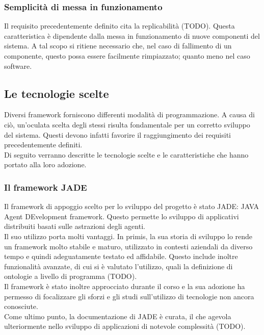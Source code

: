 \subsubsection{Semplicità di messa in funzionamento}
Il requisito precedentemente definito cita la replicabilità (TODO). Questa caratteristica è dipendente dalla messa in funzionamento di nuove componenti del sistema. A tal scopo si ritiene necessario che, nel caso di fallimento di un componente, questo possa essere facilmente rimpiazzato; quanto meno nel caso software.

\subsection{Le tecnologie scelte}
Diversi framework forniscono differenti modalità di programmazione. A causa di ciò, un'oculata scelta degli stessi risulta fondamentale per un corretto sviluppo del sistema. Questi devono infatti favorire il raggiungimento dei requisiti precedentemente definiti.\\
Di seguito verranno descritte le tecnologie scelte e le caratteristiche che hanno portato alla loro adozione.

\subsubsection{Il framework JADE}
Il framework di appoggio scelto per lo sviluppo del progetto è stato JADE: JAVA Agent DEvelopment framework. Questo permette lo sviluppo di applicativi distribuiti basati sulle astrazioni degli agenti.\\
Il suo utilizzo porta molti vantaggi. In primis, la sua storia di sviluppo lo rende un framework molto stabile e maturo, utilizzato in contesti aziendali da diverso tempo e quindi adeguatamente testato ed affidabile. Questo include inoltre funzionalità avanzate, di cui si è valutato l'utilizzo, quali la definizione di ontologie a livello di programma (TODO).\\
Il framework è stato inoltre approcciato durante il corso e la sua adozione ha permesso di focalizzare gli sforzi e gli studi sull'utilizzo di tecnologie non ancora conosciute.\\
Come ultimo punto, la documentazione di JADE è curata, il che agevola ulteriormente nello sviluppo di applicazioni di notevole complessità (TODO).


